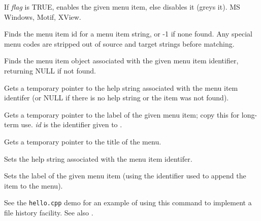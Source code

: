 
If {\it flag} is TRUE, enables the given menu item, else disables it
(greys it). MS Windows, Motif, XView.



Finds the menu item id for a menu item string, or -1 if none found.
Any special menu codes are stripped out of source and target strings
before matching.



Finds the menu item object associated with the given menu item identifier,
returning NULL if not found.



Gets a temporary pointer to the help string associated with the menu
item identifer (or NULL if there is no help string or the item was not
found).



Gets a temporary pointer to the label of the given menu item; copy this for
long-term use. {\it id} is the identifier given to .



Gets a temporary pointer to the title of the menu.



Sets the help string associated with the menu item identifer.

\label{wxmenusetlabel}


Sets the label of the given menu item (using the identifier used to
append the item to the menu).

See the {\tt hello.cpp} demo for an example of using this command to
implement a file history facility. See also .


